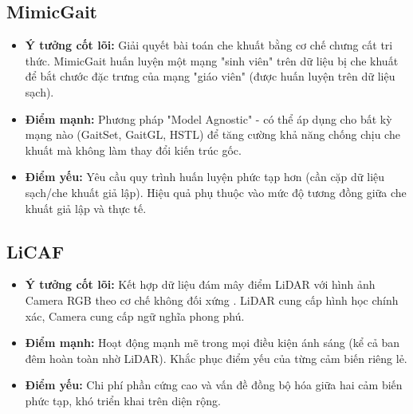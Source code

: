 \subsection{MimicGait}
\begin{itemize}
  \item \textbf{Ý tưởng cốt lõi:}
        Giải quyết bài toán che khuất bằng cơ chế chưng cất tri thức. MimicGait \cite{gupta2025mimicgait} huấn luyện một mạng "sinh viên" trên dữ liệu bị che khuất để bắt chước đặc trưng của mạng "giáo viên" (được huấn luyện trên dữ liệu sạch).
  \item \textbf{Điểm mạnh:}
        Phương pháp "Model Agnostic" - có thể áp dụng cho bất kỳ mạng nào (GaitSet\cite{chao2019gaitset}, GaitGL\cite{lin2021gait}, HSTL\cite{hstl}) để tăng cường khả năng chống chịu che khuất mà không làm thay đổi kiến trúc gốc.
  \item \textbf{Điểm yếu:}
        Yêu cầu quy trình huấn luyện phức tạp hơn (cần cặp dữ liệu sạch/che khuất giả lập). Hiệu quả phụ thuộc vào mức độ tương đồng giữa che khuất giả lập và thực tế.
\end{itemize}

\subsection{LiCAF}
\begin{itemize}
  \item \textbf{Ý tưởng cốt lõi:}
        Kết hợp dữ liệu đám mây điểm LiDAR với hình ảnh Camera RGB theo cơ chế không đối xứng \cite{deng2024licaf}. LiDAR cung cấp hình học chính xác, Camera cung cấp ngữ nghĩa phong phú.
  \item \textbf{Điểm mạnh:}
        Hoạt động mạnh mẽ trong mọi điều kiện ánh sáng (kể cả ban đêm hoàn toàn nhờ LiDAR). Khắc phục điểm yếu của từng cảm biến riêng lẻ.
  \item \textbf{Điểm yếu:}
        Chi phí phần cứng cao và vấn đề đồng bộ hóa giữa hai cảm biến phức tạp, khó triển khai trên diện rộng.
\end{itemize}
